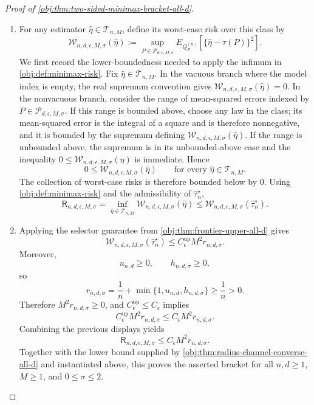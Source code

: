 \documentclass[11pt]{article}
\begin{document}
\begin{proof}[Proof of \cref{obj:thm:two-sided-minimax-bracket-all-d}]
\begin{enumerate}
\item For any estimator \(\widehat\eta\in\mathcal T_{n,M}\), define its worst-case risk over
this class by
\[
\mathcal W_{n,d,\epsilon,M,\sigma}(\widehat\eta)
:=
\sup_{P\in\mathcal P_{d,\epsilon,M,\sigma}}
E_{Q_P^{(n)}}\!\left[\{\widehat\eta-\tau(P)\}^2\right].
\]
We first record the lower-boundedness needed to apply the infimum in
\cref{obj:def:minimax-risk}.  Fix \(\widehat\eta\in\mathcal T_{n,M}\).  In the vacuous branch
where the model index is empty, the real supremum convention gives
\(\mathcal W_{n,d,\epsilon,M,\sigma}(\widehat\eta)=0\).  In the nonvacuous branch, consider
the range of mean-squared errors indexed by \(P\in\mathcal P_{d,\epsilon,M,\sigma}\).  If
this range is bounded above, choose any law in the class; its mean-squared error is the
integral of a square and is therefore nonnegative, and it is bounded by the supremum defining
\(\mathcal W_{n,d,\epsilon,M,\sigma}(\widehat\eta)\).  If the range is unbounded above, the
supremum is in its unbounded-above case and the inequality
\(0\le\mathcal W_{n,d,\epsilon,M,\sigma}(\widehat\eta)\) is immediate.  Hence
\[
0\le\mathcal W_{n,d,\epsilon,M,\sigma}(\widehat\eta)
\qquad\text{for every }\widehat\eta\in\mathcal T_{n,M}.
\]
The collection of worst-case risks is therefore bounded below by \(0\).  Using
\cref{obj:def:minimax-risk} and the admissibility of \(\widehat\tau_n^{\star}\),
\[
\mathsf R_{n,d,\epsilon,M,\sigma}
=
\inf_{\widehat\eta\in\mathcal T_{n,M}}
\mathcal W_{n,d,\epsilon,M,\sigma}(\widehat\eta)
\le
\mathcal W_{n,d,\epsilon,M,\sigma}(\widehat\tau_n^{\star}).
\] %

\item Applying the selector guarantee from \cref{obj:thm:frontier-upper-all-d} gives
\[
\mathcal W_{n,d,\epsilon,M,\sigma}(\widehat\tau_n^{\star})
\le
C_{\epsilon}^{\mathrm{up}}M^2 r_{n,d,\sigma}.
\]
Moreover,
\[
u_{n,d}\ge0,\qquad h_{n,d,\sigma}\ge0,
\]
so
\[
r_{n,d,\sigma}
=
\frac1n+\min\{1,u_{n,d},h_{n,d,\sigma}\}
\ge
\frac1n
>
0.
\]
Therefore \(M^2r_{n,d,\sigma}\ge0\), and \(C_{\epsilon}^{\mathrm{up}}\le C_{\epsilon}\)
implies
\[
C_{\epsilon}^{\mathrm{up}}M^2 r_{n,d,\sigma}
\le
C_{\epsilon}M^2 r_{n,d,\sigma}.
\]
Combining the previous displays yields
\[
\mathsf R_{n,d,\epsilon,M,\sigma}
\le
C_{\epsilon}M^2 r_{n,d,\sigma}.
\]
Together with the lower bound supplied by \cref{obj:thm:radius-channel-converse-all-d} and
instantiated above, this proves the asserted bracket for all \(n,d\ge1\), \(M\ge1\), and
\(0\le\sigma\le2\). %
\end{enumerate}
\end{proof}
\end{document}

